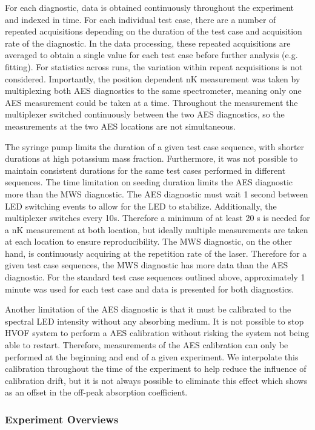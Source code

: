 For each diagnostic, data is obtained continuously throughout the experiment and indexed in time. For each individual test case, there are a number of repeated acquisitions depending on the duration of the test case and acquisition rate of the diagnostic. In the data processing, these repeated acquisitions are averaged to obtain a single value for each test case before further analysis (e.g. fitting). For statistics across runs, the variation within repeat acquisitions is not considered. Importantly, the position dependent nK measurement was taken by multiplexing both AES diagnostics to the same spectrometer, meaning only one AES measurement could be taken at a time. Throughout the measurement the multiplexer switched continuously between the two AES diagnostics, so the measurements at the two AES locations are not simultaneous.

The syringe pump limits the duration of a given test case sequence, with shorter durations at high potassium mass fraction. Furthermore, it was not possible to maintain consistent durations for the same test cases performed in different sequences.
The time limitation on seeding duration limits the AES diagnostic more than the MWS diagnostic. The AES diagnostic must wait 1 second between LED switching events to allow for the LED to stabilize. Additionally, the multiplexer switches every 10s. Therefore a minimum of at least 20 s is needed for a nK measurement at both location, but ideally multiple measurements are taken at each location to ensure reproducibility. The MWS diagnostic, on the other hand, is continuously acquiring at the repetition rate of the laser.  Therefore for a given test case sequences, the MWS diagnostic has more data than the AES diagnostic. For the standard test case sequences outlined above, approximately 1 minute was used for each test case and data is presented for both diagnostics.

Another limitation of the AES diagnostic is that it must be calibrated to the spectral LED intensity without any absorbing medium. It is not possible to stop HVOF system to perform a AES calibration without risking the system not being able to restart. Therefore, measurements of the AES calibration can only be performed at the beginning and end of a given experiment. We interpolate this calibration throughout the time of the experiment to help reduce the influence of calibration drift, but it is not always possible to eliminate this effect which shows as an offset in the off-peak absorption coefficient.


\subsubsection{Experiment Overviews}

